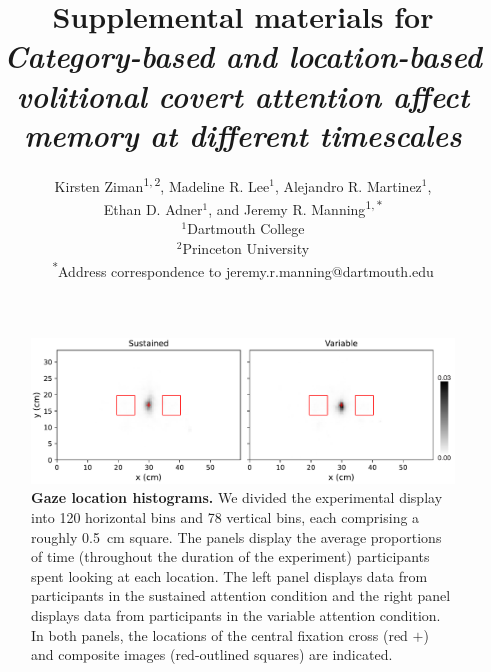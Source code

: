 \documentclass{article}
\begin{document}
\title{Supplemental materials for \textit{Category-based and location-based volitional covert attention affect
memory at different timescales}}

\author{Kirsten Ziman\textsuperscript{$1, 2$},
Madeline R. Lee$^1$,
Alejandro R. Martinez$^1$,\\
Ethan D. Adner$^1$,
and
Jeremy R. Manning\textsuperscript{$1, *$}\\[0.1in]$^1$Dartmouth College\\
$^2$Princeton University\\
\textsuperscript{*}Address correspondence to jeremy.r.manning@dartmouth.edu}


\maketitle


\renewcommand{\thefigure}{S\arabic{figure}}


  \begin{figure}[tp]
	\centering
	\includegraphics[width=1\textwidth]{figs/gaze_locations}
  
 \caption{\textbf{Gaze location histograms.} We divided the experimental
 display into 120 horizontal bins and 78 vertical bins, each comprising a
 roughly 0.5~cm square. The panels display the average proportions of time
 (throughout the duration of the experiment) participants spent looking at each
 location. The left panel displays data from participants in the sustained
 attention condition and the right panel displays data from participants in the
 variable attention condition. In both panels, the locations of the central
 fixation cross (red $+$) and composite images (red-outlined squares) are
 indicated.}
  
  \label{fig:gaze-histograms}
  \end{figure}
\end{document}
